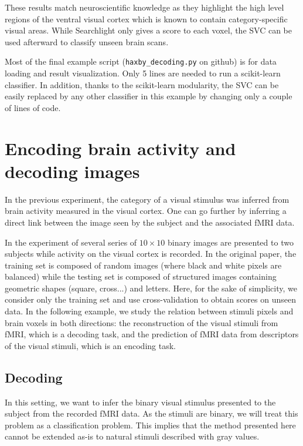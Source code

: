 \documentclass{frontiersSCNS} %
\begin{document}
These results match neuroscientific knowledge as they highlight the
high level regions of the ventral visual cortex which is known to
contain category-specific visual areas. While Searchlight only gives a
score to each voxel, the SVC can be used afterward to classify unseen
brain scans.

Most of the final example script (\texttt{haxby\_decoding.py} on github) is
for data
loading and result visualization. Only 5 lines are needed to run a scikit-learn
classifier. In addition, thanks to the scikit-learn modularity, the SVC can be easily
replaced by any other classifier in this example by changing only a
couple of lines of code.


\section{Encoding brain activity and decoding images}
\label{kamitani}

In the previous experiment, the category of a visual stimulus was inferred from
brain activity measured in the visual cortex.
One can go further by inferring a direct link between the image
seen by the subject and the associated fMRI data.

In the experiment of \cite{miyawaki2008} several series of $10{\times}10$
binary images are presented to two subjects while activity on the visual cortex
is recorded.
In the original paper, the training set is composed of random images (where black and white pixels
are balanced) while the testing set is composed of structured images containing
geometric shapes (square, cross...) and letters. Here, for the sake of simplicity, we consider only the training set and use cross-validation to
obtain scores on unseen data.
%
In the following example, we study the relation between stimuli pixels and
brain voxels in both directions: the reconstruction of the visual stimuli
from fMRI, which is a decoding task, and the prediction of fMRI data
from descriptors of the visual stimuli, which is an encoding task.

\subsection{Decoding}

In this setting, we want to infer the binary visual stimulus presented to
the subject from the recorded fMRI data.
As the stimuli are binary, we will treat this problem as a classification
problem. This implies that the method presented here cannot be extended as-is to
natural stimuli described with gray values. 
\end{document}
